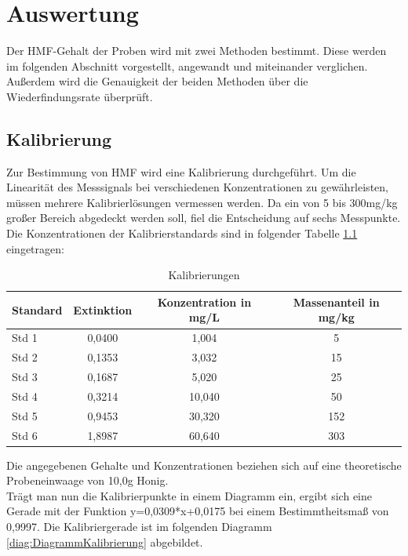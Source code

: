 \chapter{Auswertung}
Der HMF-Gehalt der Proben wird mit zwei Methoden bestimmt. Diese werden im folgenden Abschnitt vorgestellt, angewandt und miteinander verglichen. Außerdem wird die Genauigkeit der beiden Methoden über die Wiederfindungsrate überprüft.
\section{Kalibrierung}
Zur Bestimmung von HMF wird eine Kalibrierung durchgeführt. Um die Linearität des Messsignals bei verschiedenen Konzentrationen zu gewährleisten, müssen mehrere Kalibrierlösungen vermessen werden. Da ein von 5 bis 300mg/kg großer Bereich abgedeckt werden soll, fiel die Entscheidung auf sechs Messpunkte. Die Konzentrationen der Kalibrierstandards sind in folgender Tabelle \ref{tab:Kalibrierungen} eingetragen:

\begin{table}[htbp]
    \centering
    \caption{Kalibrierungen}
        \begin{tabular}{l|c|c|c}
            Standard & Extinktion & Konzentration in mg/L &  Massenanteil in mg/kg\\
            \hline
            Std 1 & 0,0400 & 1,004 & 5\\
            \hline
            Std 2 & 0,1353 & 3,032 & 15\\
            \hline
            Std 3 & 0,1687 & 5,020 & 25\\
            \hline
            Std 4 & 0,3214 & 10,040 & 50\\
            \hline
            Std 5 & 0,9453 & 30,320 & 152\\
            \hline
            Std 6 & 1,8987 & 60,640 & 303
        \end{tabular}
        \label{tab:Kalibrierungen}
\end{table}

Die angegebenen Gehalte und Konzentrationen beziehen sich auf eine theoretische Probeneinwaage von 10,0g Honig.\\
Trägt man nun die Kalibrierpunkte in einem Diagramm ein, ergibt sich eine Gerade mit der Funktion y=0,0309*x+0,0175 bei einem Bestimmtheitsmaß von 0,9997. Die Kalibriergerade ist im folgenden Diagramm \ref{diag:DiagrammKalibrierung} abgebildet.

